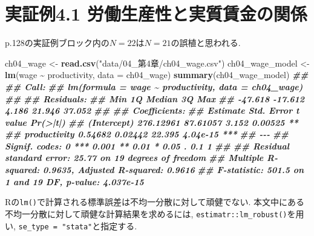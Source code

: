 \documentclass[
]{book}
\newenvironment{Shaded}{\begin{snugshade}}{\end{snugshade}}
\newcommand{\AttributeTok}[1]{\textcolor[rgb]{0.13,0.29,0.53}{#1}}
\newcommand{\DocumentationTok}[1]{\textcolor[rgb]{0.56,0.35,0.01}{\textbf{\textit{#1}}}}
\newcommand{\FunctionTok}[1]{\textcolor[rgb]{0.13,0.29,0.53}{\textbf{#1}}}
\newcommand{\NormalTok}[1]{#1}
\newcommand{\OtherTok}[1]{\textcolor[rgb]{0.56,0.35,0.01}{#1}}
\newcommand{\SpecialCharTok}[1]{\textcolor[rgb]{0.81,0.36,0.00}{\textbf{#1}}}
\newcommand{\StringTok}[1]{\textcolor[rgb]{0.31,0.60,0.02}{#1}}
\begin{document}
\hypertarget{ux5b9fux8a3cux4f8b4.1-ux52b4ux50cdux751fux7523ux6027ux3068ux5b9fux8ceaux8cc3ux91d1ux306eux95a2ux4fc2}{%
\section*{実証例4.1 労働生産性と実質賃金の関係}\label{ux5b9fux8a3cux4f8b4.1-ux52b4ux50cdux751fux7523ux6027ux3068ux5b9fux8ceaux8cc3ux91d1ux306eux95a2ux4fc2}}

p.128の実証例ブロック内の\(N=22\)は\(N=21\)の誤植と思われる.

\begin{Shaded}
\begin{Highlighting}[]
\NormalTok{ch04\_wage }\OtherTok{\textless{}{-}} \FunctionTok{read.csv}\NormalTok{(}\StringTok{"data/04\_第4章/ch04\_wage.csv"}\NormalTok{)}
\NormalTok{ch04\_wage\_model }\OtherTok{\textless{}{-}} \FunctionTok{lm}\NormalTok{(wage }\SpecialCharTok{\textasciitilde{}}\NormalTok{ productivity, }\AttributeTok{data =}\NormalTok{ ch04\_wage)}
\FunctionTok{summary}\NormalTok{(ch04\_wage\_model)}
\DocumentationTok{\#\# }
\DocumentationTok{\#\# Call:}
\DocumentationTok{\#\# lm(formula = wage \textasciitilde{} productivity, data = ch04\_wage)}
\DocumentationTok{\#\# }
\DocumentationTok{\#\# Residuals:}
\DocumentationTok{\#\#     Min      1Q  Median      3Q     Max }
\DocumentationTok{\#\# {-}47.618 {-}17.612   4.186  21.946  37.052 }
\DocumentationTok{\#\# }
\DocumentationTok{\#\# Coefficients:}
\DocumentationTok{\#\#               Estimate Std. Error t value Pr(\textgreater{}|t|)    }
\DocumentationTok{\#\# (Intercept)  276.12961   87.61057   3.152  0.00525 ** }
\DocumentationTok{\#\# productivity   0.54682    0.02442  22.395 4.04e{-}15 ***}
\DocumentationTok{\#\# {-}{-}{-}}
\DocumentationTok{\#\# Signif. codes:  0 \textquotesingle{}***\textquotesingle{} 0.001 \textquotesingle{}**\textquotesingle{} 0.01 \textquotesingle{}*\textquotesingle{} 0.05 \textquotesingle{}.\textquotesingle{} 0.1 \textquotesingle{} \textquotesingle{} 1}
\DocumentationTok{\#\# }
\DocumentationTok{\#\# Residual standard error: 25.77 on 19 degrees of freedom}
\DocumentationTok{\#\# Multiple R{-}squared:  0.9635, Adjusted R{-}squared:  0.9616 }
\DocumentationTok{\#\# F{-}statistic: 501.5 on 1 and 19 DF,  p{-}value: 4.037e{-}15}
\end{Highlighting}
\end{Shaded}

Rの\texttt{lm()}で計算される標準誤差は不均一分散に対して頑健でない.
本文中にある不均一分散に対して頑健な計算結果を求めるには, \texttt{estimatr::lm\_robust()}を用い, \texttt{se\_type\ =\ "stata"}と指定する.
\end{document}
